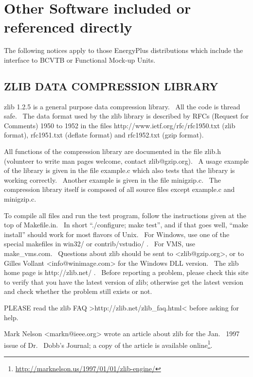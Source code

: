 \section{Other Software included or referenced directly}\label{other-software-included-or-referenced-directly}

The following notices apply to those EnergyPlus distributions which include the interface to BCVTB or Functional Mock-up Units.

\subsection{ZLIB DATA COMPRESSION LIBRARY}\label{zlib-data-compression-library}

zlib 1.2.5 is a general purpose data compression library.~ All the code is thread safe.~ The data format used by the zlib library is described by RFCs (Request for Comments) 1950 to 1952 in the files http://www.ietf.org/rfc/rfc1950.txt (zlib format), rfc1951.txt (deflate format) and rfc1952.txt (gzip format).

All functions of the compression library are documented in the file zlib.h (volunteer to write man pages welcome, contact zlib@gzip.org).~ A usage example of the library is given in the file example.c which also tests that the library is working correctly. ~Another example is given in the file minigzip.c.~ The compression library itself is composed of all source files except example.c and minigzip.c.

To compile all files and run the test program, follow the instructions given at the top of Makefile.in.~ In short ``./configure; make test'', and if that goes well, ``make install'' should work for most flavors of Unix.~ For Windows, use one of the special makefiles in win32/ or contrib/vstudio/ .~ For VMS, use make\_vms.com.~ Questions about zlib should be sent to \textless{}zlib@gzip.org\textgreater{}, or to Gilles Vollant \textless{}info@winimage.com\textgreater{} for the Windows DLL version.~ The zlib home page is http://zlib.net/ .~ Before reporting a problem, please check this site to verify that you have the latest version of zlib; otherwise get the latest version and check whether the problem still exists or not.

PLEASE read the zlib FAQ \textgreater{}http://zlib.net/zlib\_faq.html\textless{} before asking for help.

Mark Nelson \textless{}markn@ieee.org\textgreater{} wrote an article about zlib for the Jan.~ 1997 issue of Dr.~ Dobb's Journal; a copy of the article is available online\footnote{\url{http://marknelson.us/1997/01/01/zlib-engine/}}.

